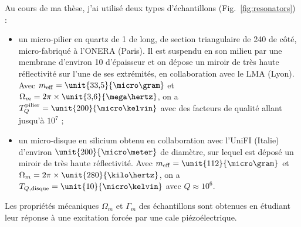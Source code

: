 \documentclass[12pt,a4paper]{article}
\begin{document}
Au cours de ma thèse, j'ai utilisé deux types d'échantillons (Fig.~\ref{fig:resonators}) :
\begin{itemize}
\item un micro-pilier en quartz de \unit{1}{\milli\meter} de long, de section triangulaire de \unit{240}{\micro\meter} de côté, micro-fabriqué à l'ONERA (Paris).
Il est suspendu en son milieu par une membrane d'environ \unit{10}{\micro\meter} d'épaisseur et on dépose un miroir de très haute réflectivité sur l'une de ses extrémités, en collaboration avec le LMA (Lyon).
Avec $m_\mathrm{eff}=\unit{33{,}5}{\micro\gram}$ et $\Omega_m=2\pi\times\unit{3{,}6}{\mega\hertz}$, on a $T_{Q}^\mathrm{pilier} = \unit{200}{\micro\kelvin}$ avec des facteurs de qualité allant jusqu'à $10^7$ ;
\item un micro-disque en silicium obtenu en collaboration avec l'UniFI (Italie) d'environ $\unit{200}{\micro\meter}$ de diamètre, sur lequel est déposé un miroir de très haute réflectivité.
Avec $m_\mathrm{eff}=\unit{112}{\micro\gram}$ et $\Omega_m=2\pi\times\unit{280}{\kilo\hertz}$, on a $T_{Q,\mathrm{disque}} = \unit{10}{\micro\kelvin}$ avec $Q\approx10^6$.
\end{itemize}
Les propriétés mécaniques $\Omega_m$ et $\Gamma_m$ des échantillons sont obtenues en étudiant leur réponse à une excitation forcée par une cale piézoélectrique.
\end{document}
